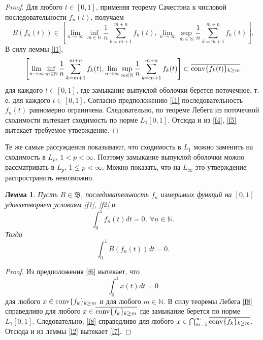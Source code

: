 \documentclass[12pt]{article}
\newtheorem{lem}[thm]{Лемма}
\def\N{{\mathbb{N}}}
\def\B{{\mathfrak{B}}}
\begin{document}
\begin{proof}
Для любого $t\in[0,1]$, применяя теорему Сачестона \cite{S} к числовой последовательности $f_n(t)$, получаем
\begin{equation}\label{f4}
B(f_n(t)) \in \left[\lim_{n\to\infty} \inf_{m\in\N} \frac1n \sum_{k=m+1}^{m+n} f_k(t), \lim_{n\to\infty} \sup_{m\in\N} \frac1n \sum_{k=m+1}^{m+n} f_k(t) \right].
 \end{equation}
 В силу леммы \ref{l1},
 \begin{equation}\label{f5}
\left[\lim_{n\to\infty} \inf_{m\in\N} \frac1n \sum_{k=m+1}^{m+n} f_k(t), \lim_{n\to\infty} \sup_{m\in\N} \frac1n \sum_{k=m+1}^{m+n} f_k(t) \right]\subset \overline{{\rm conv} \{f_k(t)\}_{k\ge m}}
 \end{equation}
 для каждого $t\in[0,1]$, где замыкание выпуклой оболочки берется поточечное, т. е. для каждого $t\in[0,1]$. Согласно  предположению \eqref{f1} последовательность $f_n(t)$ равномерно ограничена. Следовательно, по теореме Лебега из поточечной сходимости вытекает сходимость по норме $L_1[0,1]$. Отсюда и из \eqref{f4}, \eqref{f5} вытекает требуемое утверждение.
\end{proof}

Те же самые рассуждения показывают, что сходимость в $L_1$ можно заменить на сходимость в $L_p$, $1<p<\infty$. Поэтому замыкание выпуклой оболочки можно рассматривать в $L_p$, $1\le p<\infty$. Можно показать, что на $L_\infty$ это утверждение распространить невозможно.

\begin{lem}\label{l3}
Пусть $B\in \B$, последовательность $f_n$  измеримых функций на $[0,1]$  удовлетворяет условиям \eqref{f1}, \eqref{f2} и
\begin{equation}\label{f6}
\int_0^1 f_n(t) dt=0, \ \forall n\in \N.
\end{equation}
Тогда
\begin{equation}\label{f7}
\int_0^1 B(f_n(t)) dt=0.
\end{equation}
\end{lem}

 \begin{proof}
 Из предположения \eqref{f6} вытекает, что
 \begin{equation}\label{f8}
\int_0^1 x(t) dt=0
\end{equation}
для любого $x\in {\rm conv} \{f_k\}_{k\ge m}$ и для любого $m\in \N.$ В силу теоремы Лебега \eqref{f8} справедливо для любого $x\in \overline{{\rm conv} \{f_k\}_{k\ge m}}$ где замыкание берется по норме $L_1[0,1]$. Следовательно, \eqref{f8} справедливо для любого $x\in \bigcap_{m=1}^\infty\overline{{\rm conv} \{f_k\}_{k\ge m}}$. Отсюда и из леммы \ref{l2} вытекает \eqref{f7}.
 \end{proof}
\end{document}
